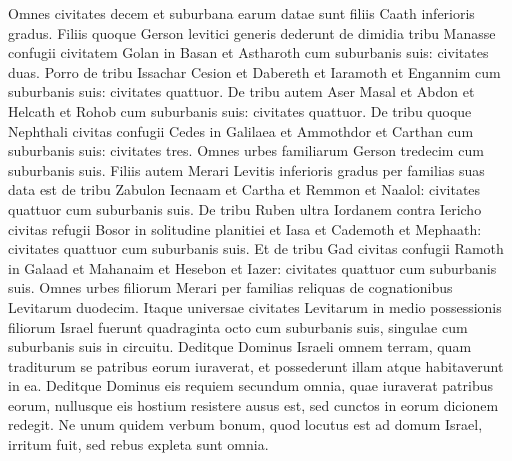 \begin{biblechapter}
\begin{biblechapter}
\begin{biblechapter}
\begin{biblechapter}
\begin{biblechapter}
\begin{biblechapter}
\begin{biblechapter}
\begin{biblechapter}
\begin{biblechapter}
\begin{biblechapter}
\begin{biblechapter}
\begin{biblechapter}
\begin{biblechapter}
\begin{biblechapter}
\begin{biblechapter}
\begin{biblechapter}
\begin{biblechapter}
\begin{biblechapter}
\begin{biblechapter}
\begin{biblechapter}
\begin{biblechapter}
\verse Omnes civitates decem et suburbana earum datae sunt filiis Caath inferioris gradus.
 \verse Filiis quoque Gerson levitici generis dederunt de dimidia tribu Manasse confugii civitatem Golan in Basan et Astharoth cum suburbanis suis: civitates duas. 
\verse Porro de tribu Issachar Cesion et Dabereth 
\verse et Iaramoth et Engannim cum suburbanis suis: civitates quattuor. 
\verse De tribu autem Aser Masal et Abdon 
\verse et Helcath et Rohob cum suburbanis suis: civitates quattuor. 
\verse De tribu quoque Nephthali civitas confugii Cedes in Galilaea et Ammothdor et Carthan cum suburbanis suis: civitates tres. 
\verse Omnes urbes familiarum Gerson tredecim cum suburbanis suis.
 \verse Filiis autem Merari Levitis inferioris gradus per familias suas data est de tribu Zabulon Iecnaam et Cartha 
\verse et Remmon et Naalol: civitates quattuor cum suburbanis suis. 
\verse De tribu Ruben ultra Iordanem contra Iericho civitas refugii Bosor in solitudine planitiei et Iasa 
\verse et Cademoth et Mephaath: civitates quattuor cum suburbanis suis. 
\verse Et de tribu Gad civitas confugii Ramoth in Galaad et Mahanaim 
\verse et Hesebon et Iazer: civitates quattuor cum suburbanis suis. 
\verse Omnes urbes filiorum Merari per familias reliquas de cognationibus Levitarum duodecim.
 \verse Itaque universae civitates Levitarum in medio possessionis filiorum Israel fuerunt quadraginta octo 
\verse cum suburbanis suis, singulae cum suburbanis suis in circuitu.
 \verse Deditque Dominus Israeli omnem terram, quam traditurum se patribus eorum iuraverat, et possederunt illam atque habitaverunt in ea. 
\verse Deditque Dominus eis requiem secundum omnia, quae iuraverat patribus eorum, nullusque eis hostium resistere ausus est, sed cunctos in eorum dicionem redegit. 
\verse Ne unum quidem verbum bonum, quod locutus est ad domum Israel, irritum fuit, sed rebus expleta sunt omnia.
 

\end{biblechapter}
\end{biblechapter}
\end{biblechapter}
\end{biblechapter}
\end{biblechapter}
\end{biblechapter}
\end{biblechapter}
\end{biblechapter}
\end{biblechapter}
\end{biblechapter}
\end{biblechapter}
\end{biblechapter}
\end{biblechapter}
\end{biblechapter}
\end{biblechapter}
\end{biblechapter}
\end{biblechapter}
\end{biblechapter}
\end{biblechapter}
\end{biblechapter}
\end{biblechapter}
